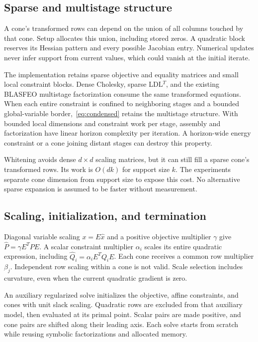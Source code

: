 \documentclass[conference]{IEEEtran}
\begin{document}
\subsection{Sparse and multistage structure}
A cone's transformed rows can depend on the union of all columns touched by that cone. Setup allocates this union, including stored zeros. A quadratic block reserves its Hessian pattern and every possible Jacobian entry. Numerical updates never infer support from current values, which could vanish at the initial iterate.

The implementation retains sparse objective and equality matrices and small local constraint blocks. Dense Cholesky, sparse LDL$^T$, and the existing BLASFEO multistage factorization consume the same transformed equations. When each entire constraint is confined to neighboring stages and a bounded global-variable border,~\eqref{eq:condensed} retains the multistage structure. With bounded local dimensions and constraint work per stage, assembly and factorization have linear horizon complexity per iteration. A horizon-wide energy constraint or a cone joining distant stages can destroy this property.

Whitening avoids dense $d\times d$ scaling matrices, but it can still fill a sparse cone's transformed rows. Its work is $O(dk)$ for support size $k$. The experiments separate cone dimension from support size to expose this cost. No alternative sparse expansion is assumed to be faster without measurement.

\subsection{Scaling, initialization, and termination}
Diagonal variable scaling $x=E\hat x$ and a positive objective multiplier $\gamma$ give $\hat P=\gamma E^TPE$. A scalar constraint multiplier $\alpha_i$ scales its entire quadratic expression, including $\hat Q_i=\alpha_iE^TQ_iE$. Each cone receives a common row multiplier $\beta_j$. Independent row scaling within a cone is not valid. Scale selection includes curvature, even when the current quadratic gradient is zero.

An auxiliary regularized solve initializes the objective, affine constraints, and cones with unit slack scaling. Quadratic rows are excluded from that auxiliary model, then evaluated at its primal point. Scalar pairs are made positive, and cone pairs are shifted along their leading axis. Each solve starts from scratch while reusing symbolic factorizations and allocated memory.
\end{document}
